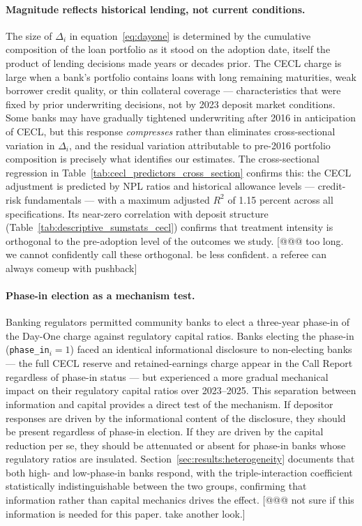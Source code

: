 \paragraph{Magnitude reflects historical lending, not current conditions.}
The size of $\Delta_i$ in equation~\eqref{eq:dayone} is determined by the
cumulative composition of the loan portfolio as it stood on the adoption date,
itself the product of lending decisions made years or decades prior.  The
CECL charge is large when a bank's portfolio contains loans with long remaining
maturities, weak borrower credit quality, or thin collateral coverage ---
characteristics that were fixed by prior underwriting decisions, not by
2023 deposit market conditions.  Some banks may have gradually tightened
underwriting after 2016 in anticipation of CECL, but this response
\textit{compresses} rather than eliminates cross-sectional variation in
$\Delta_i$, and the residual variation attributable to pre-2016 portfolio
composition is precisely what identifies our estimates.  The
cross-sectional regression in Table~\ref{tab:cecl_predictors_cross_section}
confirms this: the CECL adjustment is predicted by NPL ratios and historical
allowance levels --- credit-risk fundamentals --- with a maximum adjusted
$R^2$ of 1.15 percent across all specifications.  Its near-zero correlation
with deposit structure (Table~\ref{tab:descriptive_sumstats_cecl}) confirms
that treatment intensity is orthogonal to the pre-adoption level of the
outcomes we study. [@@@ too long. we cannot confidently call these orthogonal. be less confident. a referee can always comeup with pushback]

\paragraph{Phase-in election as a mechanism test.}
Banking regulators permitted community banks to elect a three-year phase-in
of the Day-One charge against regulatory capital ratios.  Banks electing the
phase-in (\texttt{phase\_in}$_i = 1$) faced an identical informational
disclosure to non-electing banks --- the full CECL reserve and retained-earnings
charge appear in the Call Report regardless of phase-in status --- but
experienced a more gradual mechanical impact on their regulatory capital
ratios over 2023--2025.  This separation between information and capital
provides a direct test of the mechanism.  If depositor responses are driven
by the informational content of the disclosure, they should be present
regardless of phase-in election.  If they are driven by the capital reduction
per se, they should be attenuated or absent for phase-in banks whose regulatory
ratios are insulated.  Section~\ref{sec:results:heterogeneity} documents that
both high- and low-phase-in banks respond, with the triple-interaction
coefficient statistically indistinguishable between the two groups, confirming
that information rather than capital mechanics drives the effect. [@@@ not sure if this information is needed for this paper. take another look.]

